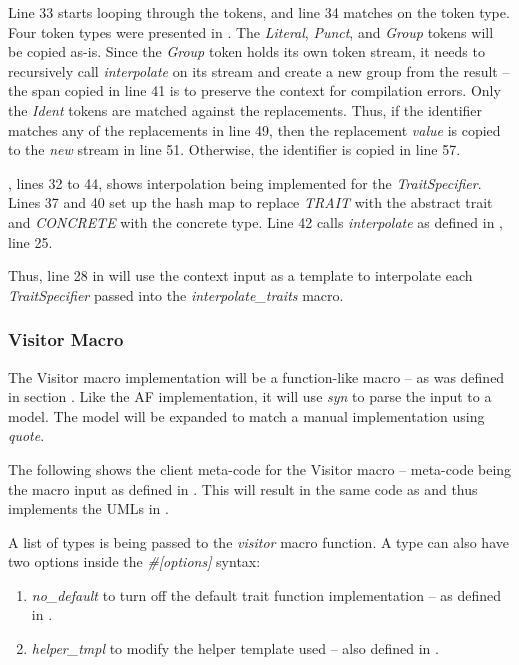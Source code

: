 Line 33 starts looping through the tokens, and line 34 matches on the token type.
Four token types were presented in .
The \textit{Literal}, \textit{Punct}, and \textit{Group} tokens will be copied as-is.
Since the \textit{Group} token holds its own token stream, it needs to recursively call \textit{interpolate} on its stream and create a new group from the result -- the span copied in line 41 is to preserve the context for compilation errors.
Only the \textit{Ident} tokens are matched against the replacements.
Thus, if the identifier matches any of the replacements in line 49, then the replacement \textit{value} is copied to the \textit{new} stream in line 51.
Otherwise, the identifier is copied in line 57.

, lines 32 to 44, shows interpolation being implemented for the \textit{TraitSpecifier}.
Lines 37 and 40 set up the hash map to replace \textit{TRAIT} with the abstract trait and \textit{CONCRETE} with the concrete type.
Line 42 calls \textit{interpolate} as defined in , line 25.

Thus, line 28 in  will use the context input as a template to interpolate each \textit{TraitSpecifier} passed into the \textit{interpolate\_traits} macro.

\subsubsection{Visitor Macro}
The Visitor macro implementation will be a function-like macro -- as was defined in section .
Like the AF implementation, it will use \textit{syn} to parse the input to a model.
The model will be expanded to match a manual implementation using \textit{quote}.

The following shows the client meta-code for the Visitor macro -- meta-code being the macro input as defined in .
This will result in the same code as  and thus implements the UMLs in .


A list of types is being passed to the \textit{visitor} macro function.
A type can also have two options inside the \textit{\#[options]} syntax:
\begin{enumerate}
	\item \textit{no\_default} to turn off the default trait function implementation -- as defined in .
	\item \textit{helper\_tmpl} to modify the helper template used -- also defined in .
\end{enumerate}

